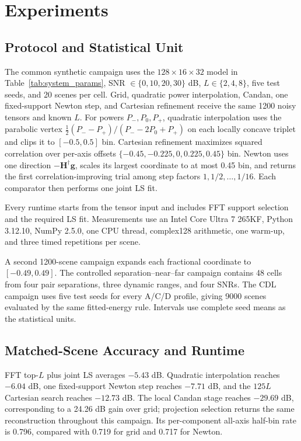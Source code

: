 \section{Experiments}

\subsection{Protocol and Statistical Unit}

The common synthetic campaign uses the $128\times16\times32$ model in Table~\ref{tab:system_params}, SNR $\in\{0,10,20,30\}$ dB, $L\in\{2,4,8\}$, five test seeds, and 20 scenes per cell. Grid, quadratic power interpolation, Candan, one fixed-support Newton step, and Cartesian refinement receive the same 1200 noisy tensors and known $L$. For powers $P_-,P_0,P_+$, quadratic interpolation uses the parabolic vertex $\frac12(P_--P_+)/(P_--2P_0+P_+)$ on each locally concave triplet and clips it to $[-0.5,0.5]$ bin. Cartesian refinement maximizes squared correlation over per-axis offsets $\{-0.45,-0.225,0,0.225,0.45\}$ bin. Newton uses one direction $-\mathbf H^\dagger\mathbf g$, scales its largest coordinate to at most 0.45 bin, and returns the first correlation-improving trial among step factors $1,1/2,\ldots,1/16$. Each comparator then performs one joint LS fit.

Every runtime starts from the tensor input and includes FFT support selection and the required LS fit. Measurements use an Intel Core Ultra 7 265KF, Python 3.12.10, NumPy 2.5.0, one CPU thread, complex128 arithmetic, one warm-up, and three timed repetitions per scene.

A second 1200-scene campaign expands each fractional coordinate to $[-0.49,0.49]$. The controlled separation--near--far campaign contains 48 cells from four pair separations, three dynamic ranges, and four SNRs. The CDL campaign uses five test seeds for every A/C/D profile, giving 9000 scenes evaluated by the same fitted-energy rule. Intervals use complete seed means as the statistical units.

\subsection{Matched-Scene Accuracy and Runtime}
\label{sec:pareto}

FFT top-$L$ plus joint LS averages $-5.43$ dB. Quadratic interpolation reaches $-6.04$ dB, one fixed-support Newton step reaches $-7.71$ dB, and the $125L$ Cartesian search reaches $-12.73$ dB. The local Candan stage reaches $-29.69$ dB, corresponding to a 24.26 dB gain over grid; projection selection returns the same reconstruction throughout this campaign. Its per-component all-axis half-bin rate is 0.796, compared with 0.719 for grid and 0.717 for Newton.

